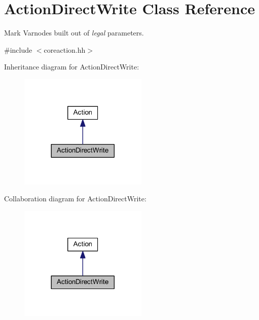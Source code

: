 \hypertarget{class_action_direct_write}{}\section{Action\+Direct\+Write Class Reference}
\label{class_action_direct_write}


Mark Varnodes built out of {\itshape legal} parameters.  




{\ttfamily \#include $<$coreaction.\+hh$>$}



Inheritance diagram for Action\+Direct\+Write\+:
\nopagebreak
\begin{figure}[H]
\begin{center}
\leavevmode
\includegraphics[width=173pt]{class_action_direct_write__inherit__graph}
\end{center}
\end{figure}


Collaboration diagram for Action\+Direct\+Write\+:
\nopagebreak
\begin{figure}[H]
\begin{center}
\leavevmode
\includegraphics[width=173pt]{class_action_direct_write__coll__graph}
\end{center}
\end{figure}
